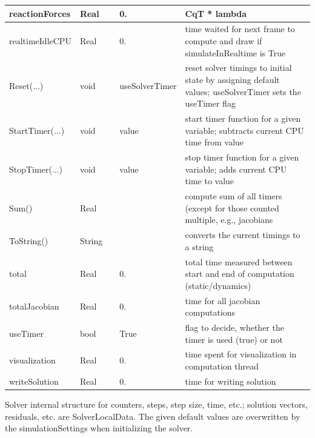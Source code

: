 \begin{center}
\begin{longtable}{| p{4.2cm} | p{2.5cm} | p{0.3cm} | p{3.0cm} | p{6cm} |}
    reactionForces &     Real &      &     0. &     CqT * lambda\\ \hline
    realtimeIdleCPU &     Real &      &     0. &     time waited for next frame to compute and draw if simulateInRealtime is True\\ \hline
    Reset(...) &     void &      &     useSolverTimer &     reset solver timings to initial state by assigning default values; useSolverTimer sets the useTimer flag\\ \hline
    StartTimer(...) &     void &      &     value &     start timer function for a given variable; subtracts current CPU time from value\\ \hline
    StopTimer(...) &     void &      &     value &     stop timer function for a given variable; adds current CPU time to value\\ \hline
    Sum() &     Real &      &      &     compute sum of all timers (except for those counted multiple, e.g., jacobians\\ \hline
    ToString() &     String &      &      &     converts the current timings to a string\\ \hline
    total &     Real &      &     0. &     total time measured between start and end of computation (static/dynamics)\\ \hline
    totalJacobian &     Real &      &     0. &     time for all jacobian computations\\ \hline
    useTimer &     bool &      &     True &     flag to decide, whether the timer is used (true) or not\\ \hline
    visualization &     Real &      &     0. &     time spent for visualization in computation thread\\ \hline
    writeSolution &     Real &      &     0. &     time for writing solution\\ \hline
	  \end{longtable}
	\end{center}




\label{sec:SolverIterationData}
Solver internal structure for counters, steps, step size, time, etc.; solution vectors, residuals, etc. are SolverLocalData. The given default values are overwritten by the simulationSettings when initializing the solver.


